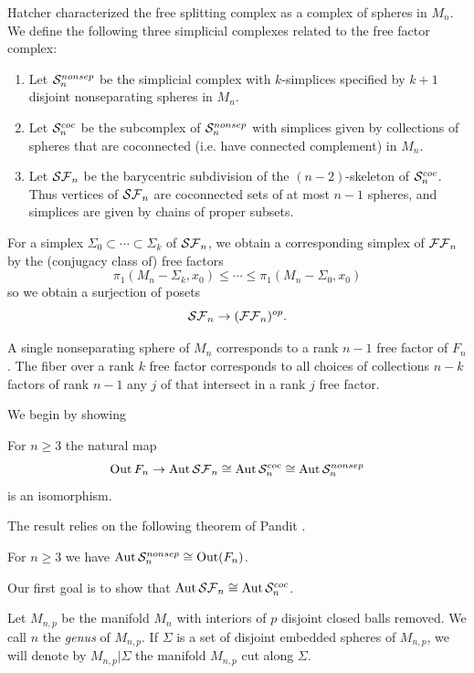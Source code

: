 Hatcher \cite{MR1660045} characterized the free splitting complex as a complex of spheres in $M_n$.
We define the following three simplicial complexes related to the free factor complex:
\begin{enumerate}[$\cdot$]
\item
Let ${ \mathcal S^{{nonsep}}_n }$ be the simplicial complex with $k$-simplices specified by $k+1$ disjoint nonseparating spheres in $M_n$.
\item
Let ${ \mathcal S^{{coc}}_{n} }$ be the subcomplex of ${ \mathcal S^{{nonsep}}_n }$ with simplices given by collections of spheres that are coconnected (i.e. have connected complement) in $M_n$.
\item
Let ${ \mathcal {SF}_n }$ be the barycentric subdivision of the $(n-2)$-skeleton of ${ \mathcal S^{{coc}}_{n} }$. Thus vertices of ${ \mathcal {SF}_n }$ are coconnected sets of at most $n-1$ spheres, and simplices are given by chains of proper subsets.
\end{enumerate}
For a simplex $\Sigma_0 \subset \cdots \subset \Sigma_k$ of ${ \mathcal {SF}_n }$, we obtain a corresponding
simplex of ${ \mathcal {FF}_n }$ by the (conjugacy class of) free factors $$\pi_1(M_n-\Sigma_k,x_0) \leqslant \cdots \leqslant \pi_1(M_n-\Sigma_0,x_0)$$ so we obtain a surjection of posets
$${ \mathcal {SF}_n } \to ({ \mathcal {FF}_n })^{op}.$$

A single nonseparating sphere of $M_n$ corresponds to a rank $n-1$ free factor of $F_n$.
The fiber over a rank $k$ free factor corresponds to all choices of collections $n-k$
factors of rank $n-1$ any $j$ of that intersect in a rank $j$ free factor.

We begin by showing

\begin{theorem}
For $n \geq 3$
the natural map
$$ \operatorname{Out} F_n \to \operatorname{Aut}{{ \mathcal {SF}_n }} \cong \operatorname{Aut}{{ \mathcal S^{{coc}}_{n} }} \cong \operatorname{Aut}{{ \mathcal S^{{nonsep}}_n }}$$
is an isomorphism.
\label{thm:twoisos}
\end{theorem}

The result relies on the following theorem of Pandit \cite{pandit}.

\begin{theorem}
 For $n \geq 3$ we have $\operatorname{Aut}{{ \mathcal S^{{nonsep}}_n }} \cong {\ensuremath{ \operatorname{Out}(F_n)}}$.
\end{theorem}

Our first goal is to show that $\operatorname{Aut}{{ \mathcal {SF}_n }} \cong \operatorname{Aut}{{ \mathcal S^{{coc}}_{n} }}$.

Let $M_{n,p}$ be the manifold $M_n$ with interiors of $p$ disjoint closed  balls removed. We call $n$ the \emph{genus} of $M_{n,p}$. If $\Sigma$ is a set of disjoint embedded spheres of $M_{n,p}$, we will denote by $M_{n,p}|\Sigma$ the manifold $M_{n,p}$ cut along $\Sigma$.

